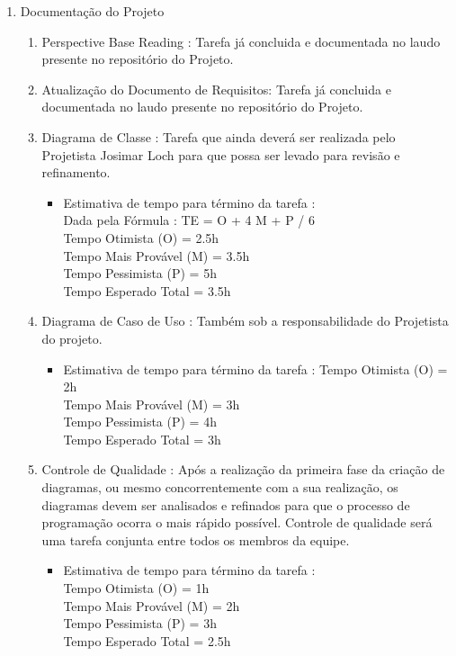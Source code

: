 \documentclass[12pt,a4paper,final]{article}
\begin{document}
\begin{enumerate}
\item Documentação do Projeto
\begin{enumerate}

\item Perspective Base Reading : Tarefa já concluida e documentada no laudo presente no repositório do Projeto.

\item Atualização do Documento de Requisitos: Tarefa já concluida e documentada no laudo presente no repositório do Projeto.

\item Diagrama de Classe : Tarefa que ainda deverá ser realizada pelo Projetista Josimar Loch para que possa ser levado para revisão e refinamento.
\begin{itemize}
\item Estimativa de tempo para término da tarefa : \\
Dada pela Fórmula : TE = O + 4 M + P / 6\\
Tempo Otimista (O) = 2.5h\\
Tempo Mais Provável (M) = 3.5h\\
Tempo Pessimista (P) = 5h\\
Tempo Esperado Total = 3.5h
\end{itemize} 

\item Diagrama de Caso de Uso : Também sob a responsabilidade do Projetista do projeto.
\begin{itemize}
\item Estimativa de tempo para término da tarefa : 
Tempo Otimista (O) = 2h\\
Tempo Mais Provável (M) = 3h\\
Tempo Pessimista (P) = 4h\\
Tempo Esperado Total = 3h
\end{itemize} 

\item Controle de Qualidade : Após a realização da primeira fase da criação de diagramas, ou mesmo concorrentemente com a sua realização, os diagramas devem ser analisados e refinados para que o processo de programação ocorra o mais rápido possível. Controle de qualidade será uma tarefa conjunta entre todos os membros da equipe.
\begin{itemize}
\item Estimativa de tempo para término da tarefa :\\
Tempo Otimista (O) = 1h\\
Tempo Mais Provável (M) = 2h\\
Tempo Pessimista (P) = 3h\\
Tempo Esperado Total = 2.5h
\end{itemize} 


\end{enumerate}
\end{enumerate}
\end{document}
